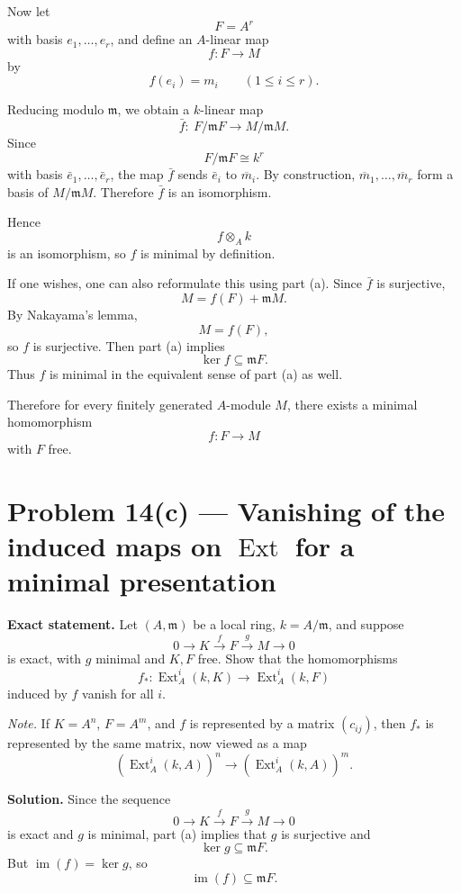 \documentclass[12pt,a4paper]{article}
\theoremstyle{notespace}
\begin{document}
Now let
\[
F=A^r
\]
with basis \(e_1,\dots,e_r\), and define an \(A\)-linear map
\[
f:F\to M
\]
by
\[
f(e_i)=m_i
\qquad (1\le i\le r).
\]

Reducing modulo \(\mathfrak m\), we obtain a \(k\)-linear map
\[
\bar f:\ F/\mathfrak m F \to M/\mathfrak m M.
\]
Since
\[
F/\mathfrak m F \cong k^r
\]
with basis \(\bar e_1,\dots,\bar e_r\), the map \(\bar f\) sends \(\bar e_i\) to \(\overline{m}_i\). By construction, \(\overline{m}_1,\dots,\overline{m}_r\) form a basis of \(M/\mathfrak m M\). Therefore \(\bar f\) is an isomorphism.

Hence
\[
f\otimes_A k
\]
is an isomorphism, so \(f\) is minimal by definition.

\medskip

If one wishes, one can also reformulate this using part (a). Since \(\bar f\) is surjective,
\[
M=f(F)+\mathfrak m M.
\]
By Nakayama's lemma,
\[
M=f(F),
\]
so \(f\) is surjective. Then part (a) implies
\[
\ker f\subseteq \mathfrak m F.
\]
Thus \(f\) is minimal in the equivalent sense of part (a) as well.

\medskip

Therefore for every finitely generated \(A\)-module \(M\), there exists a minimal homomorphism
\[
f:F\to M
\]
with \(F\) free.

\section{Problem 14(c) --- Vanishing of the induced maps on \texorpdfstring{$\operatorname{Ext}$}{Ext} for a minimal presentation}

\textbf{Exact statement.}
Let \((A,\mathfrak m)\) be a local ring, \(k=A/\mathfrak m\), and suppose
\[
0\longrightarrow K \xrightarrow{\,f\,} F \xrightarrow{\,g\,} M \longrightarrow 0
\]
is exact, with \(g\) minimal and \(K,F\) free. Show that the homomorphisms
\[
f_*:\operatorname{Ext}_A^i(k,K)\longrightarrow \operatorname{Ext}_A^i(k,F)
\]
induced by \(f\) vanish for all \(i\).

\medskip

\textit{Note.} If \(K=A^n\), \(F=A^m\), and \(f\) is represented by a matrix \((c_{ij})\), then \(f_*\) is represented by the same matrix, now viewed as a map
\[
(\operatorname{Ext}_A^i(k,A))^n\to (\operatorname{Ext}_A^i(k,A))^m.
\]

\textbf{Solution.}
Since the sequence
\[
0\to K \xrightarrow{f} F \xrightarrow{g} M \to 0
\]
is exact and \(g\) is minimal, part (a) implies that \(g\) is surjective and
\[
\ker g\subseteq \mathfrak m F.
\]
But \(\operatorname{im}(f)=\ker g\), so
\[
\operatorname{im}(f)\subseteq \mathfrak m F.
\]
\end{document}
